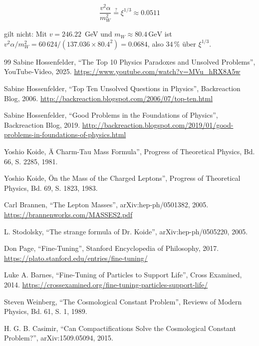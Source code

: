 	\begin{equation}
		\frac{v^2 \alpha}{m_W^2} \overset{?}{=} \xi^{1/3} \approx 0.0511
	\end{equation}
	
	gilt nicht: Mit $v = 246.22$~GeV und $m_W \approx 80.4\,\si{\giga\electronvolt}$ ist $v^2\alpha/m_W^2 = 60\,624/(137.036\times80.4^2) = 0.0684$, also $34\,\%$ über $\xi^{1/3}$.

	\begin{thebibliography}{99}
		 Sabine Hossenfelder, ``The Top 10 Physics Paradoxes and Unsolved Problems'', YouTube-Video, 2025. \url{https://www.youtube.com/watch?v=MVu_hRX8A5w}
		
		 Sabine Hossenfelder, ``Top Ten Unsolved Questions in Physics'', Backreaction Blog, 2006. \url{http://backreaction.blogspot.com/2006/07/top-ten.html}
		
		 Sabine Hossenfelder, ``Good Problems in the Foundations of Physics'', Backreaction Blog, 2019. \url{http://backreaction.blogspot.com/2019/01/good-problems-in-foundations-of-physics.html}
		
		 Yoshio Koide, Ä Charm-Tau Mass Formula'', Progress of Theoretical Physics, Bd. 66, S. 2285, 1981.
		
		 Yoshio Koide, Ön the Mass of the Charged Leptons'', Progress of Theoretical Physics, Bd. 69, S. 1823, 1983.
		
		 Carl Brannen, ``The Lepton Masses'', arXiv:hep-ph/0501382, 2005. \url{https://brannenworks.com/MASSES2.pdf}
		
		 L. Stodolsky, ``The strange formula of Dr. Koide'', arXiv:hep-ph/0505220, 2005.
		
		 Don Page, ``Fine-Tuning'', Stanford Encyclopedia of Philosophy, 2017. \url{https://plato.stanford.edu/entries/fine-tuning/}
		
		 Luke A. Barnes, ``Fine-Tuning of Particles to Support Life'', Cross Examined, 2014. \url{https://crossexamined.org/fine-tuning-particles-support-life/}
		
		 Steven Weinberg, ``The Cosmological Constant Problem'', Reviews of Modern Physics, Bd. 61, S. 1, 1989.
		
		 H. G. B. Casimir, ``Can Compactifications Solve the Cosmological Constant Problem?'', arXiv:1509.05094, 2015.
		

\end{thebibliography}

